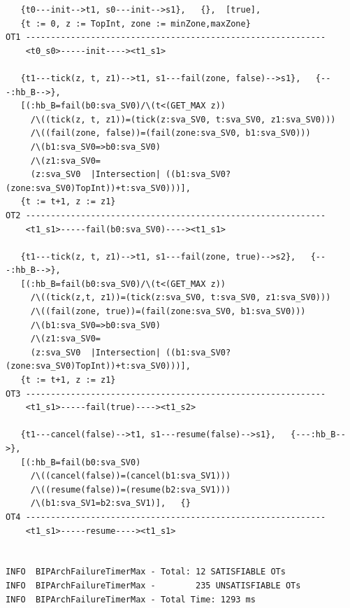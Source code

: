 \documentclass{llncs}
\makeatletter
\newcommand{\verbatimfont}[1]{\renewcommand{\verbatim@font}{\ttfamily#1}}
\makeatother
\begin{document}
\bigskip
\verbatimfont{\small}
\begin{verbatim}
   {t0---init-->t1, s0---init-->s1},   {},  [true],
   {t := 0, z := TopInt, zone := minZone,maxZone}
OT1 ------------------------------------------------------------
    <t0_s0>-----init----><t1_s1>

   {t1---tick(z, t, z1)-->t1, s1---fail(zone, false)-->s1},   {---:hb_B-->},
   [(:hb_B=fail(b0:sva_SV0)/\(t<(GET_MAX z))
     /\((tick(z, t, z1))=(tick(z:sva_SV0, t:sva_SV0, z1:sva_SV0)))
     /\((fail(zone, false))=(fail(zone:sva_SV0, b1:sva_SV0)))
     /\(b1:sva_SV0=>b0:sva_SV0)
     /\(z1:sva_SV0=
     (z:sva_SV0  |Intersection| ((b1:sva_SV0?(zone:sva_SV0)TopInt))+t:sva_SV0)))],
   {t := t+1, z := z1}
OT2 ------------------------------------------------------------
    <t1_s1>-----fail(b0:sva_SV0)----><t1_s1>

   {t1---tick(z, t, z1)-->t1, s1---fail(zone, true)-->s2},   {---:hb_B-->},
   [(:hb_B=fail(b0:sva_SV0)/\(t<(GET_MAX z))
     /\((tick(z,t, z1))=(tick(z:sva_SV0, t:sva_SV0, z1:sva_SV0)))
     /\((fail(zone, true))=(fail(zone:sva_SV0, b1:sva_SV0)))
     /\(b1:sva_SV0=>b0:sva_SV0)
     /\(z1:sva_SV0=
     (z:sva_SV0  |Intersection| ((b1:sva_SV0?(zone:sva_SV0)TopInt))+t:sva_SV0)))],
   {t := t+1, z := z1}
OT3 ------------------------------------------------------------
    <t1_s1>-----fail(true)----><t1_s2>

   {t1---cancel(false)-->t1, s1---resume(false)-->s1},   {---:hb_B-->},
   [(:hb_B=fail(b0:sva_SV0)
     /\((cancel(false))=(cancel(b1:sva_SV1)))
     /\((resume(false))=(resume(b2:sva_SV1)))
     /\(b1:sva_SV1=b2:sva_SV1)],   {}
OT4 ------------------------------------------------------------
    <t1_s1>-----resume----><t1_s1>


INFO  BIPArchFailureTimerMax - Total: 12 SATISFIABLE OTs
INFO  BIPArchFailureTimerMax -        235 UNSATISFIABLE OTs
INFO  BIPArchFailureTimerMax - Total Time: 1293 ms
\end{verbatim}
\bigskip


\end{document}
